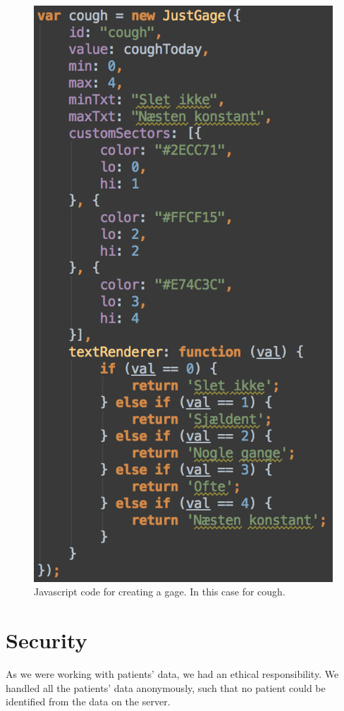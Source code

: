 \begin{figure}[h]
\centering
\includegraphics[scale=0.5]{images/implementation/gage.png}
\caption{Javascript code for creating a gage. In this case for cough.}
\label{fig:gage}
\end{figure}

 
\section{Security}
As we were working with patients' data, we had an ethical responsibility. We handled all the patients' data anonymously, such that no patient could be identified from the data on the server.

